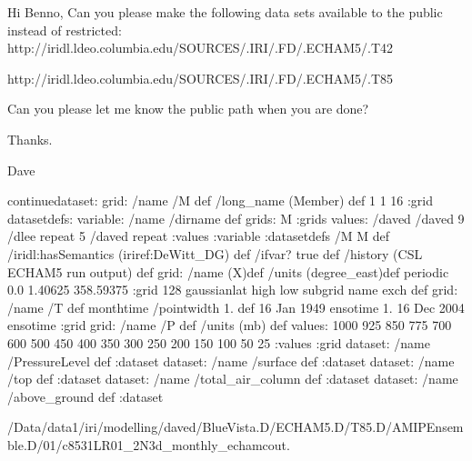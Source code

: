 Hi Benno,
Can you please make the following data sets available to the public instead of restricted:
http://iridl.ldeo.columbia.edu/SOURCES/.IRI/.FD/.ECHAM5/.T42

http://iridl.ldeo.columbia.edu/SOURCES/.IRI/.FD/.ECHAM5/.T85

Can you please let me know the public path when you are done?

Thanks.

Dave 
\begin{ingrid}
continuedataset:
grid:
/name /M def
/long_name (Member) def
1 1 16
:grid
datasetdefs:
variable:
/name /dirname def
grids: M :grids
values:
/daved
/daved
9 /dlee repeat
5 /daved repeat
:values
:variable
:datasetdefs
/M M def
/iridl:hasSemantics (iriref:DeWitt_DG) def
/ifvar? true def
/history (CSL ECHAM5 run output) def
grid:
/name (X)def
/units (degree_east)def
periodic
 0.0 1.40625 358.59375
:grid
128 gaussianlat high low subgrid name exch def
grid:
/name /T def
monthtime
/pointwidth 1. def
16 Jan 1949 ensotime
 1. 
16 Dec 2004 ensotime
:grid
grid:
/name /P def
/units (mb) def
values:
 1000 925 850 775 700 600 500 450 400 350 300 250 200 150 100 50 25
:values
:grid
dataset:
/name /PressureLevel def
:dataset
dataset:
/name /surface def
:dataset
dataset:
/name /top def
:dataset
dataset:
/name /total_air_column def
:dataset
dataset:
/name /above_ground def
:dataset
\end{ingrid}
/Data/data1/iri/modelling/daved/BlueVista.D/ECHAM5.D/T85.D/AMIPEnsemble.D/01/c8531LR01_2N3d_monthly_echamcout.%
